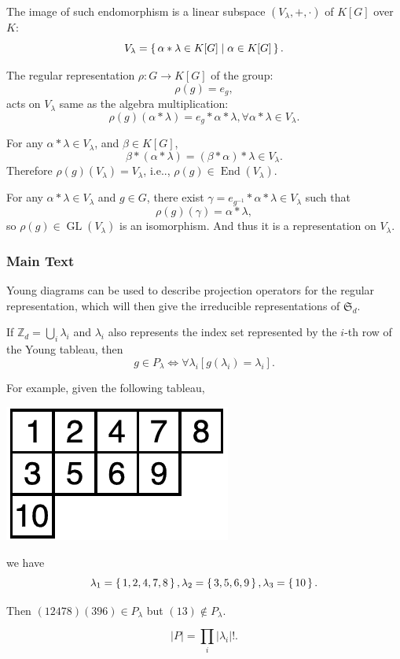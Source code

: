 \documentclass[12pt, letterpaper]{article}
\makeatletter
\newcommand{\inte}{\mathbb{Z}}
\newcommand{\GL}{\operatorname{GL}}
\newcommand{\End}{\operatorname{End}}
\newcommand\ie{i.e\@ifnextchar.{}{.\@}}
\newcommand{\red}[1]{{\color{red} #1}}
\newcommand{\card}[1]{\left\lvert #1 \right\rvert}
\theoremstyle{definition}
\theoremstyle{remark}
\theoremstyle{definition}
\theoremstyle{plain}
\numberwithin{equation}{section}
\makeatother
\begin{document}
	The image of such endomorphism is a linear subspace $(V_\lambda,+,\cdot)$ of $K[G]$ over $K$:
	\[V_\lambda=\set{\alpha*\lambda\in K[G]|\alpha \in K[G] }. \]
	
	The regular representation $\rho\colon G\to K[G]$ of the group:
	\[\rho(g)=e_g,\]
	acts on $V_\lambda$ same as the algebra multiplication:
	\[\rho(g)(\alpha*\lambda)=e_g*\alpha*\lambda,\forall \alpha*\lambda\in V_\lambda. \]
	
	For any  $\alpha*\lambda\in V_\lambda$, and $\beta\in K[G]$,
	\[\beta * (\alpha*\lambda) = (\beta*\alpha)*\lambda \in V_\lambda. \]
	Therefore $\rho(g)(V_\lambda)=V_\lambda$, \ie, $\rho(g)\in\End(V_\lambda)$.
	
	For any $\alpha*\lambda\in V_\lambda$ and $g\in G$,
	there exist $\gamma=e_{g^{-1}}*\alpha*\lambda\in V_\lambda$
	such that
	\[\rho(g)(\gamma)=\alpha*\lambda, \]
	so $\rho(g)\in \GL(V_\lambda)$ is an isomorphism.
	And thus it is a representation on $V_\lambda$.
	\subsubsection{Main Text}

	
	\red{Young diagrams can be used to describe projection operators for the 
		regular representation, which will then give the irreducible representations of
		$\mathfrak{S}_d$.}
	
	If $\inte_d=\bigcup_i \lambda_i$ and $\lambda_i$ also represents the index set represented by
	the $i$-th row of the Young tableau,
	then
	\[g\in P_\lambda\iff \forall \lambda_i [g(\lambda_i)=\lambda_i].\]
	
	For example, given the following tableau,
	
	\includegraphics{Young_tableaux_for_541_partition.pdf}
	
	we have
	\[\lambda_1=\set{1,2,4,7,8},\lambda_2=\set{3,5,6,9},\lambda_3=\set{10}.\]
	
	Then $(12478)(396)\in P_\lambda$ but $(13)\notin P_\lambda$.
	
	\[\card{P}=\prod_{i}\card{\lambda_i}!.\]
		
\end{document}
